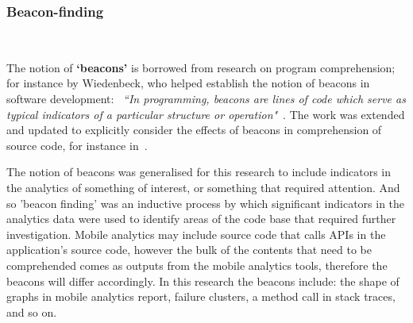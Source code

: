 

\subsubsection{Beacon-finding}~\label{section-beacon-finding-method} %

The notion of \textbf{`beacons'} is borrowed from research on program comprehension; for instance by Wiedenbeck, who helped establish the notion of beacons in software development: ~\emph{``In programming, beacons are lines of code which serve as typical indicators of a particular structure or operation"}~\citep[p.679]{WIEDENBECK1986_beacons_in_computer_program_comprehension}. The work was extended and updated to explicitly consider the effects of beacons in comprehension of source code, for instance in~\citealt{crosby2002_roles_beacons_play_in_comprehension_etc}.

The notion of beacons was generalised for this research to include indicators in the analytics of something of interest, or something that required attention.  And so 'beacon finding' was an inductive process by which significant indicators in the analytics data were used to identify areas of the code base that required further investigation.  Mobile analytics may include source code that calls APIs in the application's source code, however the bulk of the contents that need to be comprehended comes as outputs from the mobile analytics tools, therefore the beacons will differ accordingly. In this research the beacons include: the shape of graphs in mobile analytics report, failure clusters, a method call in stack traces, and so on.


